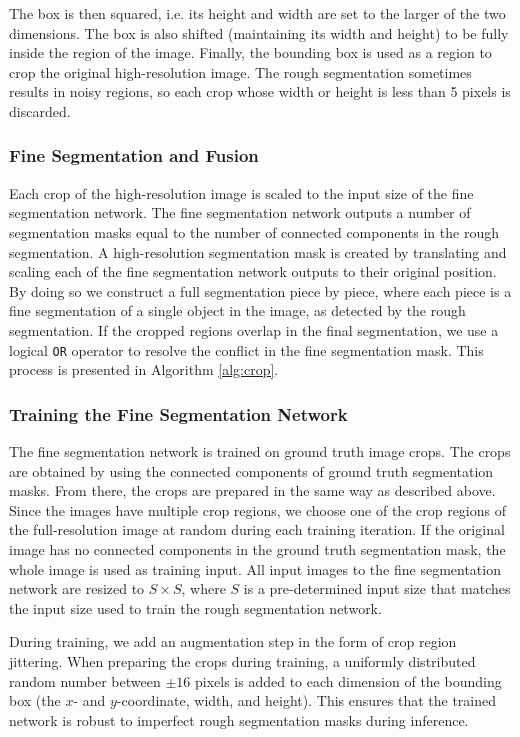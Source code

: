 The box is then squared, i.e. its height and width are set to the larger of the two dimensions. The box is also shifted (maintaining its width and height) to be fully inside the region of the image. Finally, the bounding box is used as a region to crop the original high-resolution image. The rough segmentation sometimes results in noisy regions, so each crop whose width or height is less than 5 pixels is discarded.

\pagebreak

\subsubsection{Fine Segmentation and Fusion}

Each crop of the high-resolution image is scaled to the input size of the fine segmentation network. The fine segmentation network outputs a number of segmentation masks equal to the number of connected components in the rough segmentation. A high-resolution segmentation mask is created by translating and scaling each of the fine segmentation network outputs to their original position. By doing so we construct a full segmentation piece by piece, where each piece is a fine segmentation of a single object in the image, as detected by the rough segmentation. If the cropped regions overlap in the final segmentation, we use a logical \verb|OR| operator to resolve the conflict in the fine segmentation mask. This process is presented in Algorithm \ref{alg:crop}.

\subsubsection{Training the Fine Segmentation Network}

The fine segmentation network is trained on ground truth image crops. The crops are obtained by using the connected components of ground truth segmentation masks. From there, the crops are prepared in the same way as described above. Since the images have multiple crop regions, we choose one of the crop regions of the full-resolution image at random during each training iteration. If the original image has no connected components in the ground truth segmentation mask, the whole image is used as training input. All input images to the fine segmentation network are resized to $S \times S$, where $S$ is a pre-determined input size that matches the input size used to train the rough segmentation network.

During training, we add an augmentation step in the form of crop region jittering. When preparing the crops during training, a uniformly distributed random number between $\pm16$ pixels is added to each dimension of the bounding box (the $x$- and $y$-coordinate, width, and height). This ensures that the trained network is robust to imperfect rough segmentation masks during inference.

